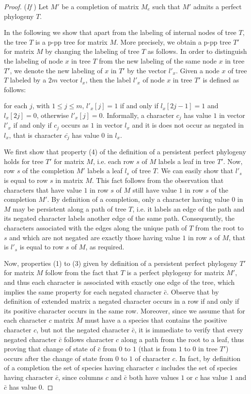 \documentclass{llncs}
\begin{document}
\begin{proof}
({\em If }) Let $M'$ be  a  completion of matrix $M_e$ such that $M'$ admits a  perfect phylogeny  $T$.


In the following we show that apart from the labeling of internal nodes of tree $T$, the tree $T$ is a p-pp  tree for matrix $M$. More precisely, we obtain  a  p-pp tree $T'$ for matrix $M$ by changing the labeling of tree $T$ as follows. 
In order to distinguish the labeling of node $x$ in tree $T$ from the new labeling of the same node $x$ in tree $T'$, we denote the new labeling of $x$ in $T'$ by the vector $l'_x$.
Given 
a node $x$ of tree $T$ labeled by a $2m$ vector $l_x$, then the label  $l'_x$  of node $x$ in tree  $T'$ is defined as follows:

for each $j$, with $1 \leq j \leq m$, $l'_x[j] = 1$ if and only if $l_x[2j -1]=1$ and $l_x[2j]=0$, otherwise  $l'_x[j] = 0.$
Informally, a character $c_j$ has value $1$ in vector $l'_x$ if and only if  $c_j$ occurs as $1$  in vector $l_x$ and it is does not occur as negated in $l_x$, that is  character $\bar{c_j}$ has value $0$ in $l_x$.

We first show that property (4) of the definition of a persistent perfect phylogeny holds for tree $T'$ for matrix $M$, i.e. each row $s$ of $M$ labels a leaf  in tree $T'$. Now, row $s$ of the completion $M'$ labels a leaf  $l_s$ of tree $T$.
We can easily show that $l'_s$ is equal to row $s$ in matrix $M$.   
This fact follows from the observation that characters that have value $1$ in row $s$ of $M$ still have value $1$ in row $s$ of the completion $M'$. By definition of a completion, only   a character having value $0$ in $M$ may be persistent
along a path of tree $T$, i.e. it labels  an  edge of the path and its negated character labels another edge of the same path.
Consequently, the characters associated with the edges along the unique path of $T$ from the root to $s$ and which are not negated are exactly those having value $1$ in row $s$ of $M$, that is $l'_s $ is equal to row $s$ of $M$, as required.


Now,   properties (1) to (3)  given by definition of a persistent perfect phylogeny $T'$ for matrix $M$ follow from the fact that $T$ is a perfect phylogeny for matrix $M'$, and thus each character is associated with exactly one edge of the tree, which implies the same property for each negated character $\bar{c}$.  Observe that by  definition of extended matrix a negated character occurs in a row if and only if its positive character occurs in the same row.  Moreover, since we assume that  for each character $c$ matrix $M$ must have a a species that contains  the positive character $c$, but not the negated character $\bar{c}$, 
 it is immediate to verify that every negated character $\bar{c}$ follows character $c$ along a path from the root to a leaf, thus proving that change of state of $\bar{c}$ from $0$ to $1$ (that is from $1$ to $0$ in tree $T'$)  occurs after the change of state from $0$ to $1$ of character $c$.  In fact, by definition of a completion the set of species  having character $c$ includes the set of species having character $\bar{c}$, since columns $c$ and $\bar{c}$ both have values $1$ or $c$ has value $1$ and $\bar{c}$ has value $0$.


\end{proof}
\end{document}
